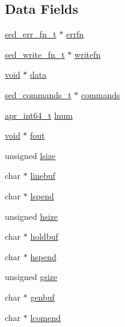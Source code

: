 \subsection*{Data Fields}
\begin{DoxyCompactItemize}
\item 
\hyperlink{libsed_8h_a0916e86efda81c86a64578a703cd0bb3}{sed\+\_\+err\+\_\+fn\+\_\+t} $\ast$ \hyperlink{structsed__eval__s_a7f0105c0f6f1c11f4e03799ee37731db}{errfn}
\item 
\hyperlink{libsed_8h_af714a0a369b727f8ea0c999547e2a41f}{sed\+\_\+write\+\_\+fn\+\_\+t} $\ast$ \hyperlink{structsed__eval__s_a212836040501592e9e950a5c873e142a}{writefn}
\item 
\hyperlink{group__MOD__ISAPI_gacd6cdbf73df3d9eed42fa493d9b621a6}{void} $\ast$ \hyperlink{structsed__eval__s_a56d7a9789f4b2c725e30e93dd97ba029}{data}
\item 
\hyperlink{libsed_8h_a859d78cc648723665a860a763f2fb291}{sed\+\_\+commands\+\_\+t} $\ast$ \hyperlink{structsed__eval__s_a5e50e5069934b1e219e3b069f42893f4}{commands}
\item 
\hyperlink{group__apr__platform_ga4b75afbf973dc6c8aea4ae75b044aa08}{apr\+\_\+int64\+\_\+t} \hyperlink{structsed__eval__s_a41903d37357b9f362b8df066db4550a5}{lnum}
\item 
\hyperlink{group__MOD__ISAPI_gacd6cdbf73df3d9eed42fa493d9b621a6}{void} $\ast$ \hyperlink{structsed__eval__s_a361dd857182a9c19914e7b439fad8069}{fout}
\item 
unsigned \hyperlink{structsed__eval__s_a43204e367a5d22a40657466520638a4f}{lsize}
\item 
char $\ast$ \hyperlink{structsed__eval__s_a22649940ee1f364aadcd2e6590b803f9}{linebuf}
\item 
char $\ast$ \hyperlink{structsed__eval__s_aa8ffb12bc8d0bbef02f647bd8ee11d0f}{lspend}
\item 
unsigned \hyperlink{structsed__eval__s_a63184f8388d2de46a2d1ab81dc092bdc}{hsize}
\item 
char $\ast$ \hyperlink{structsed__eval__s_a85e518903a9b9f9fa61f00adab9bc08c}{holdbuf}
\item 
char $\ast$ \hyperlink{structsed__eval__s_ae0c22bc397a6cd9592c4a32fe184341f}{hspend}
\item 
unsigned \hyperlink{structsed__eval__s_ab230d6407cf1c73f37f58f6e98339b48}{gsize}
\item 
char $\ast$ \hyperlink{structsed__eval__s_a9839f30a684d0bbdcfdf5d10264abe0e}{genbuf}
\item 
char $\ast$ \hyperlink{structsed__eval__s_a755aebdc052cdc94e35de3a8d84eb310}{lcomend}

\end{DoxyCompactItemize}
